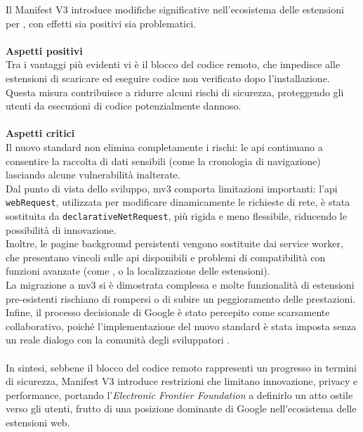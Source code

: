 \noindent Il Manifest V3 introduce modifiche significative nell’ecosistema delle estensioni per , con effetti sia positivi sia problematici.\\
\\
\textbf{Aspetti positivi}\\
Tra i vantaggi più evidenti vi è il blocco del codice remoto, che impedisce alle estensioni di scaricare ed eseguire codice non verificato dopo l’installazione. Questa misura contribuisce a ridurre alcuni rischi di sicurezza, proteggendo gli utenti da esecuzioni di codice potenzialmente dannoso.\\
\\
\textbf{Aspetti critici}\\
Il nuovo standard non elimina completamente i rischi: le \acrshort{api} continuano a consentire la raccolta di dati sensibili (come la cronologia di navigazione) lasciando alcune vulnerabilità inalterate. \\Dal punto di vista dello sviluppo, \acrshort{mv3} comporta limitazioni importanti: l'\acrshort{api} \texttt{webRequest}, utilizzata per modificare dinamicamente le richieste di rete, è stata sostituita da \texttt{declarativeNetRequest}, più rigida e meno flessibile, riducendo le possibilità di innovazione. \\Inoltre, le pagine background persistenti vengono sostituite dai service worker, che presentano vincoli sulle \acrshort{api} disponibili e problemi di compatibilità con funzioni avanzate (come ,  o la localizzazione delle estensioni). 
\\La migrazione a \acrshort{mv3} si è dimostrata complessa e molte funzionalità di estensioni pre-esistenti rischiano di rompersi o di subire un peggioramento delle prestazioni. Infine, il processo decisionale di Google è stato percepito come scarsamente collaborativo, poiché l’implementazione del nuovo standard è stata imposta senza un reale dialogo con la comunità degli sviluppatori \cite{site:mv3-eff}.\\
\\
In sintesi, sebbene il blocco del codice remoto rappresenti un progresso in termini di sicurezza, Manifest V3 introduce restrizioni che limitano innovazione, privacy e performance, portando l’\textit{Electronic Frontier Foundation} a definirlo un atto ostile verso gli utenti, frutto di una posizione dominante di Google nell’ecosistema delle estensioni web.

